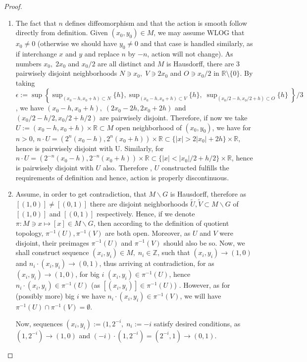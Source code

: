 \documentclass[8pt]{article} %
\newcommand{\myabs}[1]{\left|#1\right|}
\let\oldsup\sup
\renewcommand*{\sup}{\displaystyle\oldsup}
\theoremstyle{definition}
\theoremstyle{plain}
\begin{document}
\begin{proof}
	\begin{enumerate}
		\item{The fact that $n$ defines diffeomorphism and that the action is smooth follow directly from definition. Given 
			$(x_0,y_0)\in M$,
			we may assume WLOG that $x_0\neq 0$ (otherwise we should have $y_0\neq 0$ and that case is handled similarly,
			as if interchange $x$ and $y$ and replace $n$ by $-n$, action will not change). As numbers $x_0,\;2x_0$ and $x_0/2$ are all
			distinct and $M$ is Hausdorff, there are 3 pairwisely disjoint neighborhoods 
			$N\ni x_0,\;V\ni 2x_0$ and $O\ni x_0/2$ in $\mathbb{R}\setminus\{0\}$. By taking
			$\epsilon:=\sup\left\{\sup_{(x_0-h,x_0+h)\subset N}\{h\},\sup_{(x_0-h,x_0+h)\subset V}\{h\},\;
			\sup_{(x_0/2-h,x_0/2+h)\subset O}\{h\}\;\right\}/3$, we have $(x_0-h,x_0+h),\;(2x_0-2h,2x_0+2h)$ and
			$(x_0/2-h/2,x_0/2+h/2)$ are pairwisely
			disjoint. Therefore, if now we take $U:=(x_0-h,x_0+h)\times\mathbb{R}\subset M$ open neighborhood of $(x_0,y_0)$, we have
			for $n>0$, 
			$n\cdot U=(2^n(x_0-h),2^n(x_0+h))\times\mathbb{R}\subset\{\myabs{x}>2\myabs{x_0}+2h\}\times\mathbb{R}$, hence is pairwisely
			disjoint with U. Similarly, for $n\cdot U=(2^{-n}(x_0-h),2^{-n}(x_0+h))
			\times\mathbb{R}\subset\{\myabs{x}<\myabs{x_0}/2+h/2\}\times\mathbb{R}$, hence is pairwisely disjoint with $U$ also. Therefore
			, $U$ constructed fulfills the requirements of definition and hence, action is properly discontinuous.
			}
		\item{Assume, in order to get contradiction, that $M\backslash G$ is Hausdorff, therefore as $[(1,0)]\neq[(0,1)]$ there are
			disjoint neighborhoods $\tilde{U},\tilde{V}\subset M\backslash G$ of $[(1,0)]$ and $[(0,1)]$ respectively.
			Hence, if we denote $\pi:M\ni x\mapsto [x]\in M\backslash G$, then according to the definition of quotient topology,
			$\pi^{-1}(U), \pi^{-1}(V)$ are both open. Moreover, as $U$ and $V$ were disjoint, their preimages $\pi^{-1}(U)$
			and $\pi^{-1}(V)$ should also be so. Now, we shall construct sequence $(x_i,y_i)\in M,\;n_i\in\mathbb{Z}$, such that
			$(x_i,y_i)\to(1,0)$ and $n_i\cdot(x_i,y_i)\to(0,1)$, thus arriving at contradiction, for as $(x_i,y_i)\to (1,0)$, for big
			$i$ $(x_i,y_i)\in \pi^{-1}(U)$, hence $n_i\cdot(x_i,y_i)\in\pi^{-1}(U)$ (as $[(x_i,y_i)]\in\pi^{-1}(U)$)
			. However, as for (possibly more) big $i$ we have
			$n_i\cdot(x_i,y_i)\in\pi^{-1}(V)$, we will have $\pi^{-1}(U)\cap\pi^{-1}(V)=\emptyset$.

			Now, sequences $(x_i,y_i):=(1,2^{-i},\;n_i:=-i$ satisfy desired conditions, as $(1,2^{-i})\to(1,0)$ and
			$(-i)\cdot(1,2^{-i})=(2^{-i},1)\to(0,1)$.
			}
	\end{enumerate}
\end{proof}
\end{document}
